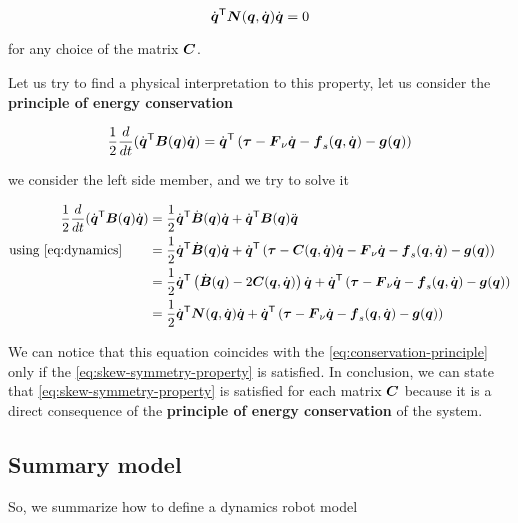 \begin{equation}
    \dq^\trans \matr N(\q,\dq) \dq = 0 \label{eq:skew-symmetry-property}
\end{equation}

for any choice of the matrix $\matr C$.

Let us try to find a physical interpretation to this property, let us consider the \textbf{principle of energy conservation}

\begin{equation}
    \frac{1}{2} \frac{d}{dt} (\dq^\trans \matr B(\q)\dq) = \dq^\trans \left( \vect \tau - \matr{F}_\nu\dq - \matr{f}_s(\q,\dq) - \vect{g}(\q) \right) \label{eq:conservation-principle}
\end{equation}

we consider the left side member, and we try to solve it

\begin{align*}
    \frac{1}{2} \frac{d}{dt} (\dq^\trans \matr B(\q)\dq) &= \frac{1}{2} \dq^\trans \dot{\matr B}(\q)\dq + \dq^\trans \matr B(\q)\ddq \\
    \text{using \ref{eq:dynamics}} \qquad &= \frac{1}{2} \dq^\trans \dot{\matr B}(\q)\dq + \dq^\trans \left( \vect{\tau} - \matr{C}(\q,\dq)\dq - \matr{F}_\nu\dq - \matr{f}_s(\q,\dq) - \vect{g}(\q) \right) \\
	&= \frac{1}{2} \dq^\trans \left( \dot{\matr B}(\q) - 2 \matr{C}(\q,\dq) \right)\dq + \dq^\trans \left( \vect{\tau} - \matr{F}_\nu\dq - \matr{f}_s(\q,\dq) - \vect{g}(\q) \right) \\
    &= \frac{1}{2} \dq^\trans \matr N(\q,\dq) \dq + \dq^\trans \left( \vect{\tau} - \matr{F}_\nu\dq - \matr{f}_s(\q,\dq) - \vect{g}(\q) \right)
\end{align*}

We can notice that this equation coincides with the \autoref{eq:conservation-principle} only if the \autoref{eq:skew-symmetry-property} is satisfied.
In conclusion, we can state that \autoref{eq:skew-symmetry-property} is satisfied for each matrix $\matr C$ because it is a direct consequence of the \textbf{principle of energy conservation} of the system.

\subsection{Summary model}

So, we summarize how to define a dynamics robot model

